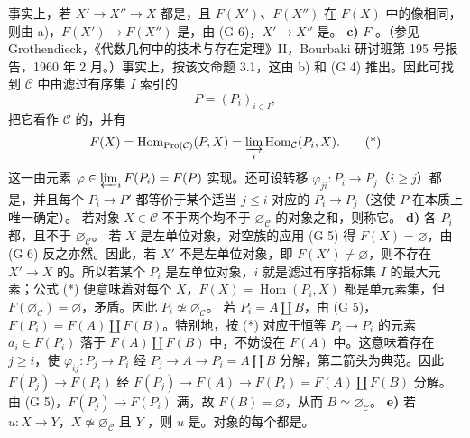 事实上，若 $X'\to X''\to X$ 都是，且 $F(X')$、$F(X'')$ 在 $F(X)$ 中的像相同，则由 a)，$F(X')\to F(X'')$ 是，由 (G 6)，$X'\to X''$ 是。
\textbf{c)}  $F$ 。（参见 Grothendieck，《代数几何中的技术与存在定理》II，Bourbaki 研讨班第 195 号报告，1960 年 2 月。）事实上，按该文命题 3.1，这由 b) 和 (G 4) 推出。因此可找到 $\mathcal C$ 中由滤过有序集 $I$ 索引的
\[P=(P_i)_{i\in I},\]
把它看作 $\mathcal C$ 的，并有
\[F(X)=\operatorname{Hom}_{\operatorname{Pro}(\mathcal C)}(P,X)=\varinjlim_i\operatorname{Hom}_{\mathcal C}(P_i,X).\tag{*}\]
这一由元素 $\varphi\in\varprojlim_iF(P_i)=F(P)$ 实现。还可设转移 $\varphi_{ji}:P_i\to P_j$（$i\geq j$）都是，并且每个 $P_i\to P'$ 都等价于某个适当 $j\leq i$ 对应的 $P_i\to P_j$（这使 $P$ 在本质上唯一确定）。
若对象 $X\in\mathcal C$ 不于两个均不于 $\varnothing_{\mathcal C}$ 的对象之和，则称它。
\textbf{d)} 各 $P_i$ 都，且不于 $\varnothing_{\mathcal C}$。
若 $X$ 是左单位对象，对空族的应用 (G 5) 得 $F(X)=\varnothing$，由 (G 6) 反之亦然。因此，若 $X'$ 不是左单位对象，即 $F(X')\neq\varnothing$，则不存在 $X'\to X$ 的。所以若某个 $P_i$ 是左单位对象，$i$ 就是滤过有序指标集 $I$ 的最大元素；公式 (*) 便意味着对每个 $X$，$F(X)=\operatorname{Hom}(P_i,X)$ 都是单元素集，但 $F(\varnothing_{\mathcal C})=\varnothing$，矛盾。因此 $P_i\not\simeq\varnothing_{\mathcal C}$。
若 $P_i=A\amalg B$，由 (G 5)，$F(P_i)=F(A)\amalg F(B)$。特别地，按 (*) 对应于恒等 $P_i\to P_i$ 的元素 $a_i\in F(P_i)$ 落于 $F(A)\amalg F(B)$ 中，不妨设在 $F(A)$ 中。这意味着存在 $j\geq i$，使 $\varphi_{ij}:P_j\to P_i$ 经 $P_j\to A\to P_i=A\amalg B$ 分解，第二箭头为典范。因此 $F(P_j)\to F(P_i)$ 经 $F(P_j)\to F(A)\to F(P_i)=F(A)\amalg F(B)$ 分解。由 (G 5)，$F(P_j)\to F(P_i)$ 满，故 $F(B)=\varnothing$，从而 $B\simeq\varnothing_{\mathcal C}$。
\textbf{e)} 若 $u:X\to Y$，$X\not\simeq\varnothing_{\mathcal C}$ 且 $Y$ ，则 $u$ 是。对象的每个都是。

